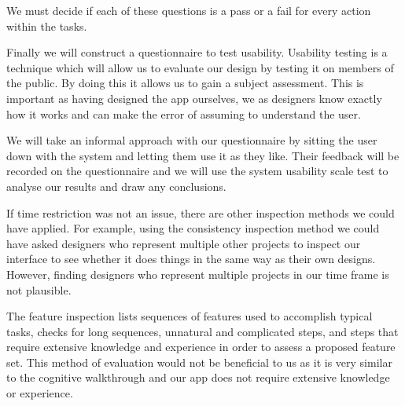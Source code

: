 We must decide if each of these questions is a pass or a fail for every action
within the tasks.

Finally we will construct a questionnaire to test usability.  Usability testing
is a technique which will allow us to evaluate our design by testing it on
members of the public. By doing this it allows us to gain a subject assessment.
This is important as having designed the app ourselves, we as designers know
exactly how it works and can make the error of assuming to understand the user.

We will take an informal approach with our questionnaire by sitting the user
down with the system and letting them use it as they like. Their feedback will
be recorded on the questionnaire and we will use the system usability scale
test to analyse our results and draw any conclusions.

If time restriction was not an issue, there are other inspection methods we
could have applied.  For example, using the consistency inspection method we
could have asked designers who represent multiple other projects to inspect our
interface to see whether it does things in the same way as their own designs.
However, finding designers who represent multiple projects in our time frame is
not plausible.

The feature inspection lists sequences of features used to accomplish typical
tasks, checks for long sequences, unnatural and complicated steps, and steps
that require extensive knowledge and experience in order to assess a proposed
feature set. This method of evaluation would not be beneficial to us as it is
very similar to the cognitive walkthrough and our app does not require
extensive knowledge or experience.
